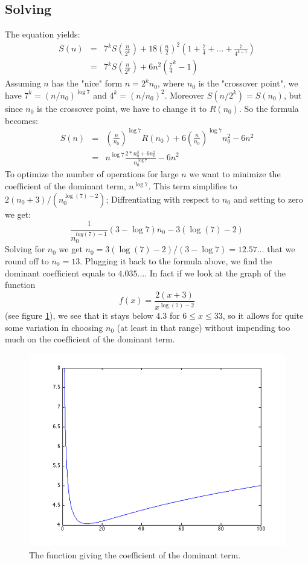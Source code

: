 \documentclass{article}
\begin{document}
\subsection{Solving}
The equation yields:
\begin{eqnarray*}
S(n) &=& 7^k S(\frac{n}{2^k}) + 18(\frac{n}{2})^2(1 + \frac{7}{4} + \ldots + \frac{7}{4^{k-1}}) \\
	 &=& 7^k S(\frac{n}{2^k}) + 6 n^2 (\frac{7}{4}^k - 1) 
\end{eqnarray*}
Assuming $ n $ has the "nice" form $ n = 2^k n_0 $, where $ n_0 $ is the "crossover point", we have $ 7^k = (n/n_0)^{\log 7} $ and $ 4^k = (n/n_0)^2 $.  
Moreover $ S(n/2^k) = S(n_0) $, but since $ n_0 $ is the crossover point, we have to change it to $ R(n_0) $.
So the formula becomes:
\begin{eqnarray*}
S(n) &=& (\frac{n}{n_0})^{\log 7} R(n_0) + 6(\frac{n}{n_0})^{\log 7}n_0^2 - 6 n^2 \\
	 &=& n^{\log 7}\frac{2*n_0^3 + 6 n_0^2}{n_0^{\log 7}} - 6 n^2
\end{eqnarray*}
To optimize the number of operations for large $ n $ we want to minimize the coefficient of the dominant term, $ n^{\log 7} $.
This term simplifies to $ 2(n_0 + 3)/(n_0^{\log(7) - 2}) $;
Diffrentiating with respect to $ n_0 $ and setting to zero we get:
\[
\frac{1}{n_0^{log(7) - 1}} (3 - \log 7)n_0 - 3(\log(7) - 2)
\]
Solving for $ n_0 $ we get $ n_0 = 3 (\log(7) - 2)/(3 - \log 7) = 12.57\ldots $ that we round off to $ n_0 = 13 $.
Plugging it back to the formula above, we find the dominant coefficient equals to $ 4.035\ldots $.
In fact if we look at the graph of the function 
\[
f(x) = \frac{2(x + 3)}{x^{\log(7) - 2}}
\]
(see figure \ref{coef_funct}), we see that it stays below $ 4.3 $ for $ 6 \leq x \leq 33 $, so it allows for quite some variation in choosing $ n_0 $ (at least in that range) without impending too much on the coefficient of the dominant term.
\begin{figure}[h]
\vspace{.2in}
\centerline {
	\includegraphics[scale=.6]{coef_funct.png}
}
\caption{The function giving the coefficient of the dominant term. \label{coef_funct}}
\end{figure}
\end{document}
